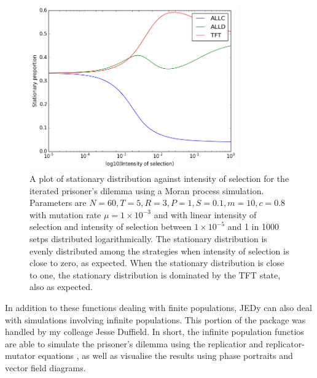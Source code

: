 \begin{figure}[h]
    \centering
    \includegraphics[width = 0.8\textwidth]{graphics/stationarydist}
    \caption{A plot of stationary distribution against intensity of selection for the iterated prisoner's dilemma using a Moran process simulation.
        Parameters are $N = 60, T = 5, R = 3, P = 1, S = 0.1, m = 10, c = 0.8$ with mutation rate $\mu = 1 \times 10^{-3}$ and with linear intensity of selection and intensity of selection between $1 \times 10^{-5}$ and 1 in 1000 setps distributed logarithmically.
        The stationary distribution is evenly distributed among the strategies when intensity of selection is close to zero, as expected.
    When the stationary distribution is close to one, the stationary distribution is dominated by the TFT state, also as expected.}
    \label{stationarydist}
\end{figure}

In addition to these functions dealing with finite populations, JEDy can also deal with simulations involving infinite populations.
This portion of the package was handled by my colleage Jesse Duffield.
In short, the infinite population functios are able to simulate the prisoner's dilemma using the replicatior and replicator-mutator equations \cite{imhofetal}, as well as visualise the results using phase portraits and vector field diagrams.
